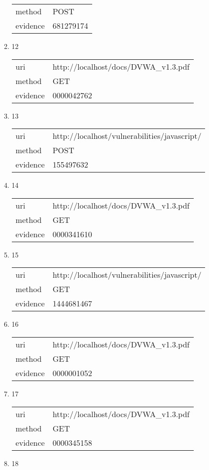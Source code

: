 \documentclass[10pt]{article}
\begin{document}
\begin{itemize}
\begin{enumerate}
\begin{tabular}{| l | p{12cm}}
method & POST \\
evidence & 681279174 \\
\end{tabular}
\item[] 12
\begin{tabular}{| l | p{12cm}}
uri & http://localhost/docs/DVWA\_v1.3.pdf \\
method & GET \\
evidence & 0000042762 \\
\end{tabular}
\item[] 13
\begin{tabular}{| l | p{12cm}}
uri & http://localhost/vulnerabilities/javascript/ \\
method & POST \\
evidence & 155497632 \\
\end{tabular}
\item[] 14
\begin{tabular}{| l | p{12cm}}
uri & http://localhost/docs/DVWA\_v1.3.pdf \\
method & GET \\
evidence & 0000341610 \\
\end{tabular}
\item[] 15
\begin{tabular}{| l | p{12cm}}
uri & http://localhost/vulnerabilities/javascript/ \\
method & GET \\
evidence & 1444681467 \\
\end{tabular}
\item[] 16
\begin{tabular}{| l | p{12cm}}
uri & http://localhost/docs/DVWA\_v1.3.pdf \\
method & GET \\
evidence & 0000001052 \\
\end{tabular}
\item[] 17
\begin{tabular}{| l | p{12cm}}
uri & http://localhost/docs/DVWA\_v1.3.pdf \\
method & GET \\
evidence & 0000345158 \\
\end{tabular}
\item[] 18
\begin{tabular}{| l | p{12cm}}

\end{tabular}
\end{enumerate}
\end{itemize}
\end{document}
